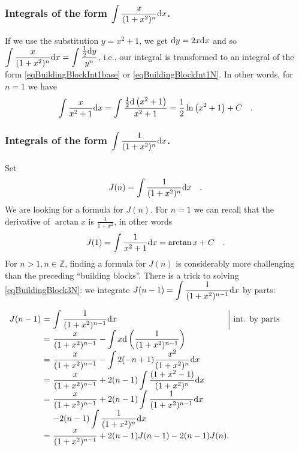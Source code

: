 \documentclass[12pt]{book}
\renewcommand{\Arctan}{\arctan}
\begin{document}
\subsubsection{Integrals of the form $\displaystyle\int \frac{x}{(1+x ^2)^n} {\normalfont \text{d}} x $.}
If we use the substitution $y=x^2+1$, we get ${\normalfont \text{d}} y=2x{\normalfont \text{d}} x $ and so $\displaystyle \int \frac{x}{(1+x ^2)^n} {\normalfont \text{d}} x = \displaystyle\int \frac{\frac12 {\normalfont \text{d}} y}{y^n} $, i.e., our integral is transformed to an integral of the form \eqref{eqBuildingBlockInt1base} or  \eqref{eqBuildingBlockInt1N}. In other words, for $n=1$ we have
\[
\int \frac{x}{x^2+1}{\normalfont \text{d}} x= \int \frac{\frac{1}2 {\normalfont \text{d}}\left(x^2+1\right)}{x^2+1}= \frac{1}{2}\ln \left(x^2+1\right) +C\quad .
\]
\subsubsection {Integrals of the form $\displaystyle\int \frac{1}{(1+x ^2)^n} {\normalfont \text{d}} x $.}
Set 
\begin{equation}\label{eqBuildingBlock3N}
J(n)=\int \frac{1}{(1+x ^2)^n}{\normalfont \text{d}} x\quad .
\end{equation}
We are looking for a formula for $J(n)$. For $n=1$ we can recall that the derivative of $\Arctan x$ is $\displaystyle\frac{1}{1+x^2}$, in other words
\[
J(1)=\int \frac{1}{x^2+1}\diff x= \Arctan x+C\quad .
\]
For $n>1, n\in \mathbb Z$, finding a formula for $J(n)$ is considerably more challenging than the preceding ``building blocks''. There is a trick to solving \eqref{eqBuildingBlock3N}: we integrate $\displaystyle J(n-1)= \int \frac{1}{(1+x ^2)^{n-1}}{\normalfont \text{d}} x$ by parts:

$
\begin{array}{r@{~}c@{~}l@{}l@{}|l}
J(n-1)&=&\displaystyle \int \frac{1}{(1+x ^2)^{n-1}}\diff x &&\text{int. by parts}\\
&=&\displaystyle \frac{x}{(1+x ^2)^{n-1}}-\int x \diff \left(\frac{1}{(1+x ^2)^{ n - 1 } } \right)\\
&=&\displaystyle\frac{x}{(1+x ^2)^{n-1}}- \int 2(-n+1)\frac{x^2}{(1+x^2)^n}\diff x\\
&=&\displaystyle\frac{x}{(1+x ^2)^{n-1}}+2(n-1) \int \frac{(1+x^2-1)}{(1+x^2)^n}\diff x\\
&=&\displaystyle\frac{x}{(1+x ^2)^{n-1}} +2(n-1)\int \frac{1}{(1+x^2)^{n-1}}\diff x \\&&\displaystyle -2(n-1) \int \frac{1}{(1+x^2)^n}\diff x\\
&=&\displaystyle  \frac{x}{(1+x ^2)^{n-1}} +2(n-1)J(n-1)-2(n-1)J(n).
\end{array}
$
\end{document}
